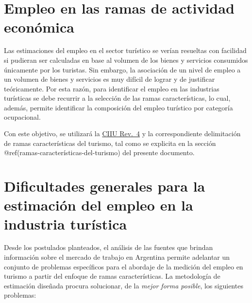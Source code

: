 \documentclass[
  openany]{book}
\begin{document}
\hypertarget{empleo-en-las-ramas-de-actividad-econuxf3mica}{%
\section{Empleo en las ramas de actividad económica}\label{empleo-en-las-ramas-de-actividad-econuxf3mica}}

Las estimaciones del empleo en el sector turístico se verían resueltas con facilidad si pudieran ser calculadas en base al volumen de los bienes y servicios consumidos únicamente por los turistas. Sin embargo, la asociación de un nivel de empleo a un volumen de bienes y servicios es muy difícil de lograr y de justificar teóricamente. Por esta razón, para identificar el empleo en las industrias turísticas se debe recurrir a la selección de las ramas características, lo cual, además, permite identificar la composición del empleo turístico por categoría ocupacional.

Con este objetivo, se utilizará la \href{https://unstats.un.org/unsd/publication/seriesm/seriesm_4rev4s.pdf}{CIIU Rev.~4} y la correspondiente delimitación de ramas características del turismo, tal como se explicita en la sección @ref(ramas-características-del-turismo) del presente documento.

\hypertarget{dificultades-generales-para-la-estimaciuxf3n-del-empleo-en-la-industria-turuxedstica}{%
\section{Dificultades generales para la estimación del empleo en la industria turística}\label{dificultades-generales-para-la-estimaciuxf3n-del-empleo-en-la-industria-turuxedstica}}

Desde los postulados planteados, el análisis de las fuentes que brindan información sobre el mercado de trabajo en Argentina permite adelantar un conjunto de problemas específicos para el abordaje de la medición del empleo en turismo a partir del enfoque de ramas características. La metodología de estimación diseñada procura solucionar, de la \emph{mejor forma posible}, los siguientes problemas:
\end{document}
